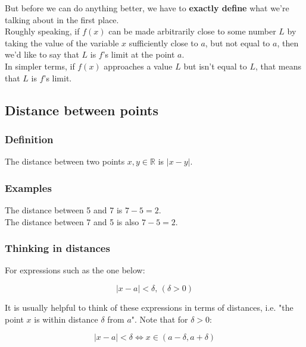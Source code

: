 \documentclass[11pt]{article}
\begin{document}
But before we can do anything better, we have to \textbf{exactly define} what we're talking about in the first place.
\\[0pt]

Roughly speaking, if \(f(x)\) can be made arbitrarily close to some number \(L\) by taking the value of the variable \(x\) sufficiently close to \(a\), but not equal to \(a\), then we'd like to say that \(L\) is \(f\)'s limit at the point \(a\).
\\[0pt]

In simpler terms, if \(f(x)\) approaches a value \(L\) but isn't equal to \(L\), that means that \(L\) is \(f\)'s limit.


\subsection{Distance between points}
\label{sec:org49d12fc}

\subsubsection{Definition}
\label{sec:org15295e6}
The distance between two points \(x, y \in \mathbb{R}\) is \(|x - y|\).

\subsubsection{Examples}
\label{sec:org0e72403}
The distance between 5 and 7 is \(7 - 5 = 2\).
\\[0pt]

The distance between 7 and 5 is also \(7 - 5 = 2\).


\subsubsection{Thinking in distances}
\label{sec:org3e9849d}

For expressions such as the one below:

\begin{equation*}
|x - a| < \delta, \, (\delta > 0)
\end{equation*}

It is usually helpful to think of these expressions in terms of distances, i.e. "the point \(x\) is within distance \(\delta\) from \(a\)". Note that for \(\delta > 0\):

\begin{equation}
|x - a| < \delta \Leftrightarrow x \in (a - \delta, a + \delta)
\end{equation}
\end{document}
